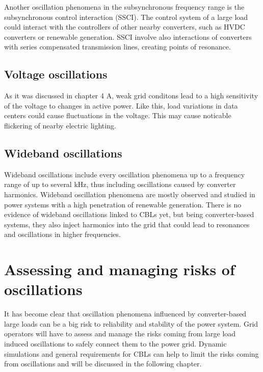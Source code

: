 \documentclass[conference]{IEEEtran}
\begin{document}
Another oscillation phenomena in the subsynchronous frequency range is the subsynchronous control interaction (SSCI). The control system of a large load could interact with the controllers of other nearby converters, such as HVDC converters or renewable generation. SSCI involve also interactions of converters with series compensated transmission lines, creating points of resonance.\cite{recomm} \cite{pnnl}

\subsection{Voltage oscillations}
As it was discussed in chapter 4 A, weak grid conditons lead to a high sensitivity of the voltage to changes in active power. Like this, load variations in data centers could cause fluctuations in the voltage. This may cause noticable flickering of nearby electric lighting.\cite{emt}

\subsection{Wideband oscillations}
Wideband oscillations include every oscillation phenomena up to a frequency range of up to several kHz, thus including oscillations caused by converter harmonics. Wideband oscillation phenomena are mostly observed and studied in power systems with a high penetration of renewable generation.\cite{wideband} There is no evidence of wideband oscillations linked to CBLs yet, but being converter-based systems, they also inject harmonics into the grid that could lead to resonances and oscillations in higher frequencies.

\section{Assessing and managing risks of oscillations}
It has become clear that oscillation phenomena influenced by converter-based large loads can be a big risk to reliability and stability of the power system. Grid operators will have to assess and manage the risks coming from large load induced oscillations to safely connect them to the power grid. Dynamic simulations and general requirements for CBLs can help to limit the risks coming from oscillations and will be discussed in the following chapter.
\end{document}
